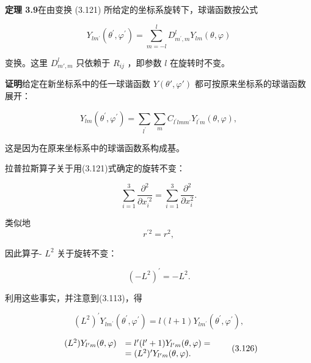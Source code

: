 \textbf{定理 3.9}\quad 在由变换 (3.121) 所给定的坐标系旋转下，球谐函数按公式

\begin{equation*}
Y _ {l m ^ {\prime}} \left(\theta^ {\prime}, \varphi^ {\prime}\right) = \sum_ {m = - l} ^ {l} D _ {m ^ {\prime}, m} ^ {l} Y _ {l m} (\theta , \varphi)\tag{3.122}
\end{equation*}

变换。这里 $D_{m', m}^{l}$ 只依赖于 $R_{ij}$ ，即参数 $l$ 在旋转时不变。

\textbf{证明}\quad 给定在新坐标系中的任一球谐函数 $Y(\theta', \varphi')$ 都可按原来坐标系的球谐函数展开：

\begin{equation*}
Y _ {l m} \left(\theta^ {\prime}, \varphi^ {\prime}\right) = \sum_ {l ^ {\prime}} \sum_ {m} C _ {l ^ {\prime} l m m ^ {\prime}} Y _ {l ^ {\prime} m} (\theta , \varphi),\tag{3.123}
\end{equation*}

这是因为在原来坐标系中的球谐函数系构成基。

拉普拉斯算子关于用(3.121)式确定的旋转不变：

\begin{equation*}
\sum_ {i = 1} ^ {3} \frac {\partial^ {2}}{\partial x _ {i} ^ {\prime 2}} = \sum_ {i = 1} ^ {3} \frac {\partial^ {2}}{\partial x _ {i} ^ {2}}.\tag{3.124}
\end{equation*}

类似地
\begin{equation*}
r ^ {\prime 2} = r ^ {2},
\end{equation*}

因此算子- $L^2$ 关于旋转不变：

\begin{equation*}
(- L ^ {2}) ^ {\prime} = - L ^ {2}.
\end{equation*}

利用这些事实，并注意到(3.113)，得

\begin{equation*}
(L ^ {2}) ^ {\prime} Y _ {l m ^ {\prime}} \left(\theta^ {\prime}, \varphi^ {\prime}\right) = l (l + 1) Y _ {l m ^ {\prime}} \left(\theta^ {\prime}, \varphi^ {\prime}\right),\tag{3.125}
\end{equation*}

\begin{equation*}
\begin{array}{r l} (L ^ {2}) Y _ {l ^ {\prime} m} (\theta , \varphi) & = l ^ {\prime} (l ^ {\prime} + 1) Y _ {l ^ {\prime} m} (\theta , \varphi) = \\ & = (L ^ {2}) ^ {\prime} Y _ {l ^ {\prime} m} (\theta , \varphi). \end{array}\tag{3.126}
\end{equation*}

